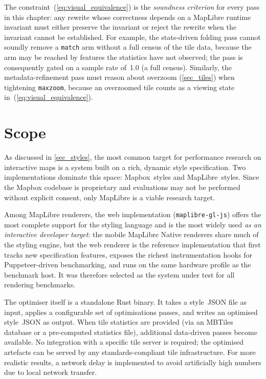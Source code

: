 The constraint~(\ref{eq:visual_equivalence}) is the \emph{soundness criterion} for every pass in this chapter: any rewrite whose correctness depends on a MapLibre runtime invariant must either preserve the invariant or reject the rewrite when the invariant cannot be established.
For example, the stats-driven folding pass cannot soundly remove a \texttt{match} arm without a full census of the tile data, because the arm may be reached by features the statistics have not observed; the pass is consequently gated on a sample rate of~1.0 (a full census).
Similarly, the metadata-refinement pass must reason about overzoom (\cref{sec_tiles}) when tightening \texttt{maxzoom}, because an overzoomed tile counts as a viewing state in~(\ref{eq:visual_equivalence}).

\section{Scope}\label{sec_scope}

As discussed in \cref{sec_styles}, the most common target for performance research on interactive maps is a system built on a rich, dynamic style specification.
Two implementations dominate this space: Mapbox~styles and MapLibre~styles.
Since the Mapbox codebase is proprietary and evaluations may not be performed without explicit consent, only MapLibre is a viable research target.

Among MapLibre renderers, the web implementation (\texttt{maplibre-gl-js}) offers the most complete support for the styling language and is the most widely used \emph{as an interactive developer target}: the mobile MapLibre Native renderers share much of the styling engine, but the web renderer is the reference implementation that first tracks new specification features, exposes the richest instrumentation hooks for Puppeteer-driven benchmarking, and runs on the same hardware profile as the benchmark host.
It was therefore selected as the system under test for all rendering benchmarks.

The optimiser itself is a standalone Rust binary.
It takes a style~JSON file as input, applies a configurable set of optimisations passes, and writes an optimised style~JSON as output.
When tile statistics are provided (via an MBTiles database or a pre-computed statistics file), additional data-driven passes become available.
No integration with a specific tile server is required; the optimised artefacts can be served by any standards-compliant tile infrastructure.
For more realistic results, a network delay is implemented to avoid artificially high numbers due to local network transfer.

